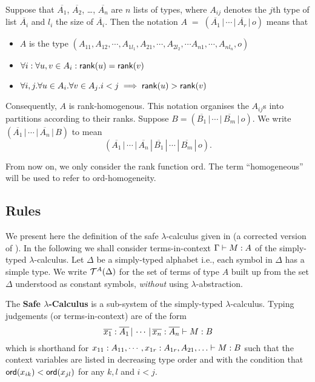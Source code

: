 Suppose that $\overline{A_1}$, $\overline{A_2}$, \ldots,
$\overline{A_n}$ are $n$ lists of types, where $A_{ij}$ denotes the
$j$th type of list $\overline{A_i}$ and $l_i$ the size of
$\overline{A_i}$. Then the notation $A \; = \; (\overline{A_1} \, |
\, \cdots \, | \, \overline{A_r} \, | \, o)$ means that
\begin{itemize}
  \item $A$ is the type $(A_{11},A_{12},\cdots, A_{1l_1}, A_{21}, \cdots,A_{2l_2}, \cdots A_{n1},\cdots, A_{nl_n},o)$
  \item $\forall i: \forall u,v \in A_i : {\sf rank}(u) = {\sf rank}(v) $
  \item $\forall i,j . \forall u \in A_i . \forall v \in A_j . i<j \implies {\sf rank}(u) >
   {\sf rank}(v) $
\end{itemize}
Consequently, $A$ is rank-homogenous. This notation organises the
$A_{ij}$s into partitions according to their ranks. Suppose $B =
(\overline{B_1} \, | \, \cdots \, | \, \overline{B_m} \, | \, o)$.
We write $(\overline{A_1} \, | \, \cdots \, | \, \overline{A_n} \, |
\, {B})$ to mean
\[(\overline{A_1} \, | \, \cdots \, | \, \overline{A_n} \, | \,
\overline{B_1} \, | \, \cdots \, | \, \overline{B_m} \, | \, o).\]

From now on, we only consider the rank function {\sf ord}. The term
``homogeneous'' will be used to refer to {\sf ord}-homogeneity.


\subsection{Rules}

We present here the definition of the safe $\lambda$-calculus given
in \cite{Ong2005} (a corrected version of
\cite{DBLP:conf/fossacs/AehligMO05}). In the following we shall
consider terms-in-context ${{\Gamma} \vdash {M : A}}$ of the simply-typed
$\lambda$-calculus. Let $\Delta$ be a simply-typed alphabet i.e.,
each symbol in $\Delta$ has a simple type. We write
${\cal T}^{A}(\Delta)$ for the set of terms of type $A$ built up from
the set $\Delta$ understood as constant symbols, \emph{without}
using $\lambda$-abstraction.


The \textbf{Safe $\lambda$-Calculus} is a sub-system of the
simply-typed $\lambda$-calculus. Typing judgements (or
terms-in-context) are of the form
\begin{equation}
\nonumber {{\overline{x_1}:\overline{A_1} \, | \, \cdots \, | \,
\overline{x_n} :  \overline{A_n}} \vdash {M : B}}
\end{equation}
which is shorthand for ${{x_{11} : A_{11}, \cdots, x_{1r}:
A_{1r}, A_{21},\ldots } \vdash {M : B}}$ such that the context variables are listed in decreasing type order and
 with the condition that ${\sf ord}(x_{ik}) < {\sf ord}(x_{jl})$ for any $k, l$ and $i<j$.

